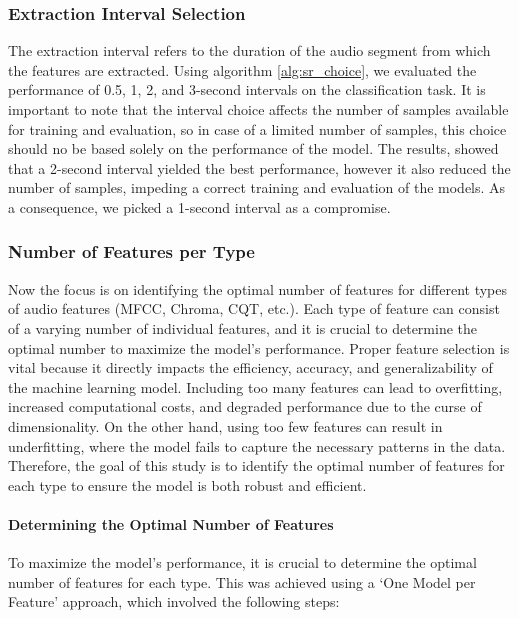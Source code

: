 \subsubsection*{Extraction Interval Selection}  %
\label{sec:extraction_interval}
The extraction interval refers to the duration of the audio segment from which the features are extracted.
Using algorithm \ref{alg:sr_choice}, we evaluated the performance of 0.5, 1, 2, and 3-second intervals
on the classification task. It is important to note that the interval choice affects the number of samples
available for training and evaluation, so in case of a limited number of samples, this choice should no be based
solely on the performance of the model. The results, showed that a 2-second interval yielded the best performance,
however it also reduced the number of samples, impeding a correct training and evaluation of the models.
As a consequence, we picked a 1-second interval as a compromise.

\subsubsection*{Number of Features per Type} %
Now the focus is on identifying the optimal number of features for different types of audio features (MFCC, Chroma, CQT, etc.).
Each type of feature can consist of a varying number of individual features, and it is crucial to determine the optimal number to maximize
the model's performance. Proper feature selection is vital because it directly impacts the efficiency, accuracy,
and generalizability of the machine learning model. Including too many features can lead to overfitting, increased computational costs,
and degraded performance due to the curse of dimensionality. On the other hand, using too few features can result in underfitting,
where the model fails to capture the necessary patterns in the data. Therefore, the goal of this study is to identify the optimal number of features
for each type to ensure the model is both robust and efficient.

\paragraph{Determining the Optimal Number of Features}

To maximize the model's performance, it is crucial to determine the optimal number of features for each type.
This was achieved using a `One Model per Feature' approach, which involved the following steps:

